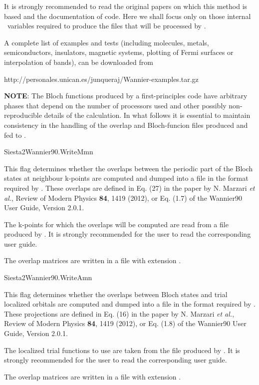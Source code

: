 It is strongly recommended to read the original papers on which this
method is based and the  documentation of  code.
Here we shall focus only on those internal \siesta\ variables
required to produce the files that will be processed
by .

A complete list of examples and tests (including molecules, metals, 
semiconductors, insulators, magnetic systems, plotting of Fermi surfaces
or interpolation of bands), can be downloaded from

 http://personales.unican.es/junqueraj/Wannier-examples.tar.gz

\textbf{NOTE}: The Bloch functions produced by a first-principles code
      have arbitrary phases that depend on the number of processors
      used and other possibly non-reproducible details of the
      calculation. In what follows it is essential to maintain
      consistency in the handling of the overlap and Bloch-funcion
      files produced and fed to .
%

\begin{fdflogicalF}{Siesta2Wannier90.WriteMmn}
        
  This flag determines whether the overlaps between the periodic part
  of the Bloch states at neighbour k-points are computed and dumped
  into a file in the format required by .  These
  overlaps are defined in Eq. (27) in the paper by N. Marzari
  \textit{et al.}, Review of Modern Physics \textbf{84}, 1419 (2012),
  or Eq. (1.7) of the Wannier90 User Guide, Version 2.0.1.

  The k-points for which the overlaps will be computed are read from a
   file produced by . It is strongly
  recommended for the user to read the corresponding user guide.

  The overlap matrices are written in a file with extension
  .

\end{fdflogicalF}

\begin{fdflogicalF}{Siesta2Wannier90.WriteAmn}
  
  This flag determines whether the overlaps between Bloch states and
  trial localized orbitals are computed and dumped into a file in the
  format required by .  These projections are
  defined in Eq. (16) in the paper by N. Marzari \textit{et al.},
  Review of Modern Physics \textbf{84}, 1419 (2012), or Eq. (1.8) of
  the Wannier90 User Guide, Version 2.0.1.

  The localized trial functions to use are taken from the
   file produced by . It is strongly
  recommended for the user to read the corresponding user guide.

  The overlap matrices are written in a file with extension
  .

\end{fdflogicalF}

